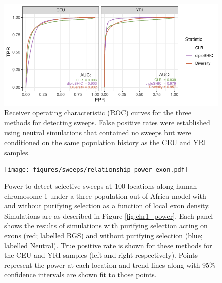 \documentclass[hidelinks]{article}
\newcommand{\stopsupplement}{%
        \setcounter{table}{0}
        \renewcommand{\thetable}{\arabic{table}}%
        \setcounter{figure}{0}
        \renewcommand{\thefigure}{\arabic{figure}}%
     }
\begin{document}
\begin{figure}
    \centering
    \includegraphics[width=0.8 \textwidth]{figures/sweeps/roc_neutral_null.pdf}
    \caption{
    \label{fig:roc-curves}
    Receiver operating characteristic (ROC) curves for the three methods for detecting sweeps.
    False positive rates were established using neutral simulations that contained no sweeps
    but were conditioned on the same population history as the CEU and YRI samples.
    }
\end{figure}


\begin{figure}
    \centering
    \texttt{[image: figures/sweeps/relationship\_power\_exon.pdf]}
    \caption{
    Power to detect selective sweeps at 100 locations along human chromosome 1 under a three-population out-of-Africa model \citep{gutenkunst2009inferring}  
    with and without purifying selection as a function of local exon density.
    Simulations are as described in Figure \ref{fig:chr1_power}.
    Each panel shows the results of simulations with purifying selection acting on exons (red; labelled BGS)
    and without purifying selection (blue; labelled Neutral).
    True positive rate is shown for these methods for the CEU and YRI samples (left and right respectively).
    Points represent the power at each location and trend lines along with 95\% confidence intervals are shown fit to those points.
    }
    \label{fig:power-exon}
\end{figure}


\stopsupplement
\end{document}

